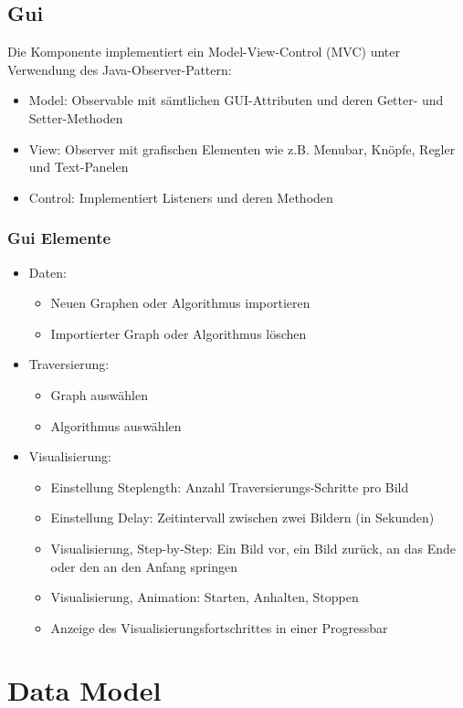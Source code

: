 \subsection{Gui}
\label{subsec:Gui}
Die Komponente implementiert ein Model-View-Control (MVC) unter Verwendung des Java-Observer-Pattern:
\begin{itemize}
  \item Model: Observable mit s\"amtlichen GUI-Attributen und deren Getter- und Setter-Methoden
  \item View: Observer mit grafischen Elementen wie z.B. Menubar, Kn\"opfe, Regler und Text-Panelen
  \item Control: Implementiert Listeners und deren Methoden
\end{itemize}
% 
\subsubsection{Gui Elemente}
\label{subsubsec:Gui Elemente}
\begin{itemize}
  \item Daten:
  \begin{itemize}
    \item Neuen Graphen oder Algorithmus importieren
    \item Importierter Graph oder Algorithmus l\"oschen
  \end{itemize}
  \item Traversierung:
  \begin{itemize}
    \item Graph ausw\"ahlen
    \item Algorithmus ausw\"ahlen
  \end{itemize}
  \item Visualisierung:
  \begin{itemize}
      \item Einstellung Steplength: Anzahl Traversierungs-Schritte pro Bild
      \item Einstellung Delay: Zeitintervall zwischen zwei Bildern (in Sekunden)      
      \item Visualisierung, Step-by-Step: Ein Bild vor, ein Bild zur\"uck, an das Ende oder den an den Anfang springen
      \item Visualisierung, Animation: Starten, Anhalten, Stoppen
      \item Anzeige des Visualisierungsfortschrittes in einer Progressbar
  \end{itemize}
\end{itemize}
% 
\section{Data Model}
\label{sec:Data Model}